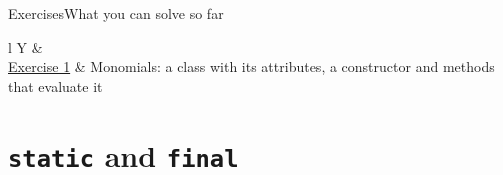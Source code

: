 \documentclass[\deckoptions]{beamer}
\begin{document}
\begin{frame}{Exercises}{What you can solve so far}
  \begin{datatable}{l Y}
     &  \\
    \grouprule
    \href{https://github.com/alfaro96/programming-fundamentals-ii/tree/main/code/Classes\%2C\%20objects\%2C\%20and\%20methods/Exercise\%201}{Exercise 1} &
      Monomials: a class with its attributes, a constructor and methods that evaluate it \\
    \grouprule
  \end{datatable}
\end{frame}

\section{\texttt{static} and \texttt{final}}
\end{document}
